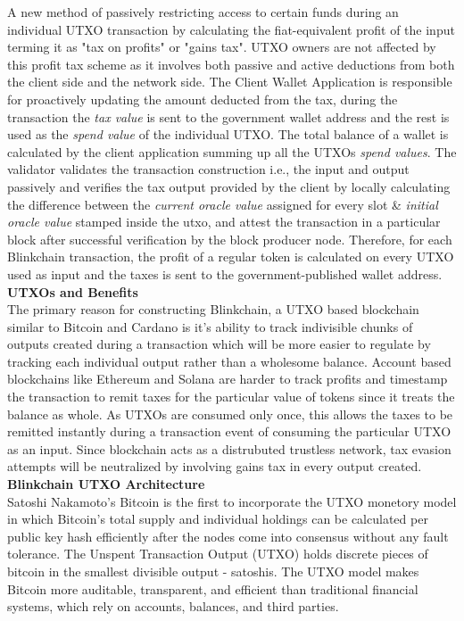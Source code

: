 \documentclass[letterpaper,11pt]{article}
\begin{document}
A new method of passively restricting  access to certain funds during  an individual UTXO transaction by calculating the fiat-equivalent profit of the input terming it as "tax on profits" or "gains tax". UTXO owners are not affected by this profit tax scheme as it involves both  passive and active deductions from both the client side and the network side. The Client Wallet Application  is responsible for proactively updating the amount deducted from the tax, during the transaction the \textit{tax value} is sent to the government wallet address and the rest is used as the \textit{spend value} of the individual UTXO. The total balance of a wallet is calculated by the client application summing up all the UTXOs \textit{spend values}. The validator validates the transaction construction i.e., the input and output passively and verifies the tax output provided by the client by locally calculating the difference between the \textit{current oracle value} assigned for every slot \& \textit{initial oracle value} stamped inside the utxo, and attest the transaction in a particular block after successful verification by the block producer node. Therefore, for each Blinkchain transaction, the profit of a regular token is calculated on every UTXO used as input and the taxes is sent  to the government-published wallet address.\\

\textbf{UTXOs and Benefits}\\


The primary reason for constructing Blinkchain, a UTXO based blockchain similar to Bitcoin and Cardano is it's ability to track indivisible chunks of outputs created during a transaction which will be more easier to regulate by tracking each individual output rather than a wholesome balance. Account based blockchains like Ethereum and Solana are harder to track profits and timestamp the transaction to remit taxes for the particular value of tokens since it treats the balance as whole. As UTXOs are consumed only once, this allows the taxes to be remitted instantly during a transaction event of consuming the particular UTXO as an input. Since blockchain acts as a distrubuted trustless network, tax evasion attempts will be neutralized by involving gains tax in every output created.\\

\textbf{Blinkchain UTXO Architecture}\\

Satoshi Nakamoto's Bitcoin is the first to incorporate the UTXO monetory model in which Bitcoin's total supply and individual holdings can be calculated per public key hash efficiently after the nodes come into consensus without any fault tolerance. The Unspent Transaction Output (UTXO) holds discrete pieces of bitcoin in the smallest divisible output - satoshis. The UTXO model makes Bitcoin more auditable, transparent, and efficient than traditional financial systems, which rely on accounts, balances, and third parties. \\
\end{document}

